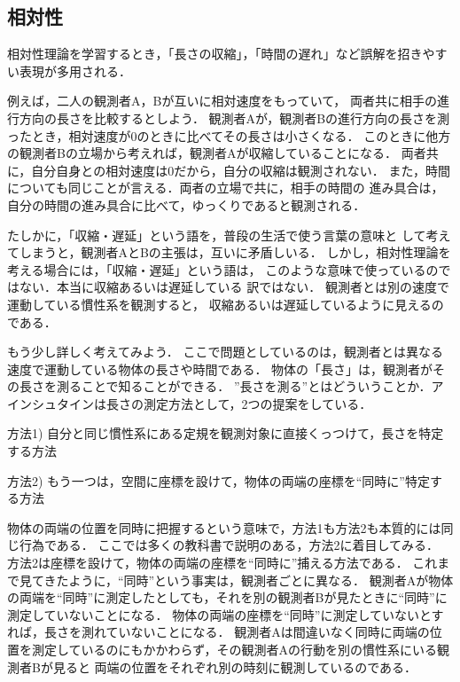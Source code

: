 \subsection{相対性}
        相対性理論を学習するとき，「長さの収縮」，「時間の遅れ」など誤解を招きやすい表現が多用される．

        例えば，二人の観測者A，Bが互いに相対速度をもっていて，
        両者共に相手の進行方向の長さを比較するとしよう．
        観測者Aが，観測者Bの進行方向の長さを測ったとき，相対速度が0のときに比べてその長さは小さくなる．
        このときに他方の観測者Bの立場から考えれば，観測者Aが収縮していることになる．
        両者共に，自分自身との相対速度は0だから，自分の収縮は観測されない．
        また，時間についても同じことが言える．両者の立場で共に，相手の時間の
        進み具合は，自分の時間の進み具合に比べて，ゆっくりであると観測される．

        たしかに，「収縮・遅延」という語を，普段の生活で使う言葉の意味と
        して考えてしまうと，観測者AとBの主張は，互いに矛盾しいる．
        しかし，相対性理論を考える場合には，「収縮・遅延」という語は，
        このような意味で使っているのではない．本当に収縮あるいは遅延している
        訳ではない．
        観測者とは別の速度で運動している慣性系を観測すると，
        収縮あるいは遅延しているように見えるのである．

        もう少し詳しく考えてみよう．
        ここで問題としているのは，観測者とは異なる速度で運動している物体の長さや時間である．
        物体の「長さ」は，観測者がその長さを測ることで知ることができる．
        ”長さを測る”とはどういうことか．アインシュタインは長さの測定方法として，2つの提案をしている．
            \begin{description}
                \item{方法1) } 自分と同じ慣性系にある定規を観測対象に直接くっつけて，長さを特定する方法
                \item{方法2) } もう一つは，空間に座標を設けて，物体の両端の座標を“同時に”特定する方法
            \end{description}
        物体の両端の位置を同時に把握するという意味で，方法1も方法2も本質的には同じ行為である．
        ここでは多くの教科書で説明のある，方法2に着目してみる．
        方法2は座標を設けて，物体の両端の座標を“同時に”捕える方法である．
        これまで見てきたように，“同時”という事実は，観測者ごとに異なる．
        観測者Aが物体の両端を“同時”に測定したとしても，それを別の観測者Bが見たときに“同時”に測定していないことになる．
        物体の両端の座標を“同時”に測定していないとすれば，長さを測れていないことになる．
        観測者Aは間違いなく同時に両端の位置を測定しているのにもかかわらず，その観測者Aの行動を別の慣性系にいる観測者Bが見ると
        両端の位置をそれぞれ別の時刻に観測しているのである．


